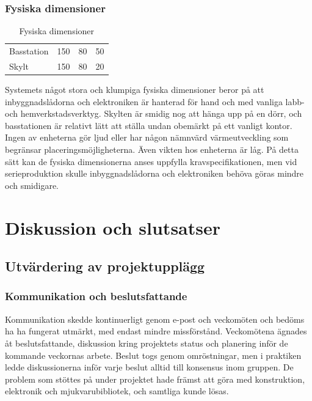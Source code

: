 \documentclass[a4paper,11pt]{article}
\begin{document}
\subsubsection{Fysiska dimensioner}
\begin{table}[h]
\centering
	\begin{tabular}{|l|c|c|c|}
	Basstation & 150 & 80 & 50 \\
	Skylt & 150 & 80 & 20 \\
	\end{tabular}
\caption{Fysiska dimensioner}
\label{tab:dimensiontable}
\end{table}

Systemets något stora och klumpiga fysiska dimensioner beror på att inbyggnadslådorna och elektroniken är hanterad för hand och med vanliga labb- och hemverkstadsverktyg. Skylten är smidig nog att hänga upp på en dörr, och basstationen är relativt lätt att ställa undan obemärkt på ett vanligt kontor. Ingen av enheterna gör ljud eller har någon nämnvärd värmeutveckling som begränsar placeringsmöjligheterna. Även vikten hos enheterna är låg. På detta sätt kan de fysiska dimensionerna anses uppfylla kravspecifikationen, men vid serieproduktion skulle inbyggnadslådorna och elektroniken behöva göras mindre och smidigare.

\section{Diskussion och slutsatser}

\subsection{Utvärdering av projektupplägg}

\subsubsection{Kommunikation och beslutsfattande}
Kommunikation skedde kontinuerligt genom e-post och veckomöten och bedöms ha ha fungerat utmärkt, med endast mindre missförstånd. Veckomötena ägnades åt beslutsfattande, diskussion kring projektets status och planering inför de kommande veckornas arbete. Beslut togs genom omröstningar, men i praktiken ledde diskussionerna inför varje beslut alltid till konsensus inom gruppen. De problem som stöttes på under projektet hade främst att göra med konstruktion, elektronik och mjukvarubibliotek, och samtliga kunde lösas.\\
\end{document}
